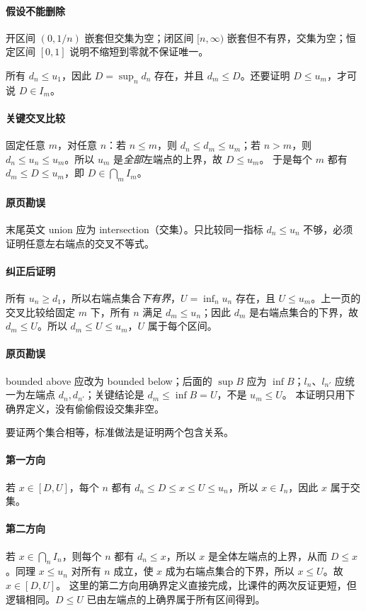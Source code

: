 \paragraph{假设不能删除}开区间 $(0,1/n)$ 嵌套但交集为空；闭区间 $[n,\infty)$ 嵌套但不有界，交集为空；恒定区间 $[0,1]$ 说明不缩短到零就不保证唯一。

所有 $d_n\le u_1$，因此 $D=\sup_n d_n$ 存在，并且 $d_m\le D$。还要证明 $D\le u_m$，才可说 $D\in I_m$。
\paragraph{关键交叉比较}固定任意 $m$，对任意 $n$：若 $n\le m$，则 $d_n\le d_m\le u_m$；若 $n>m$，则 $d_n\le u_n\le u_m$。所以 $u_m$ 是\emph{全部}左端点的上界，故 $D\le u_m$。
于是每个 $m$ 都有 $d_m\le D\le u_m$，即 $D\in\bigcap_m I_m$。
\paragraph{原页勘误}末尾英文 union 应为 intersection（交集）。只比较同一指标 $d_n\le u_n$ 不够，必须证明任意左右端点的交叉不等式。

\paragraph{纠正后证明}所有 $u_n\ge d_1$，所以右端点集合\emph{下有界}，$U=\inf_n u_n$ 存在，且 $U\le u_m$。上一页的交叉比较给固定 $m$ 下，所有 $n$ 满足 $d_m\le u_n$；因此 $d_m$ 是右端点集合的下界，故 $d_m\le U$。所以 $d_m\le U\le u_m$，$U$ 属于每个区间。
\paragraph{原页勘误}bounded above 应改为 bounded below；后面的 $\sup B$ 应为 $\inf B$；$l_n$、$l_{n'}$ 应统一为左端点 $d_n,d_{n'}$；关键结论是 $d_m\le\inf B=U$，不是 $u_m\le U$。
本证明只用下确界定义，没有偷偷假设交集非空。

要证两个集合相等，标准做法是证明两个包含关系。
\paragraph{第一方向}若 $x\in[D,U]$，每个 $n$ 都有 $d_n\le D\le x\le U\le u_n$，所以 $x\in I_n$，因此 $x$ 属于交集。
\paragraph{第二方向}若 $x\in\bigcap_n I_n$，则每个 $n$ 都有 $d_n\le x$，所以 $x$ 是全体左端点的上界，从而 $D\le x$。同理 $x\le u_n$ 对所有 $n$ 成立，使 $x$ 成为右端点集合的下界，所以 $x\le U$。故 $x\in[D,U]$。
这里的第二方向用确界定义直接完成，比课件的两次反证更短，但逻辑相同。$D\le U$ 已由左端点的上确界属于所有区间得到。

